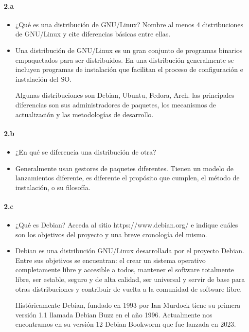 \documentclass[10pt,a4paper]{paper}
\begin{document}
	
	\paragraph{2.a}
	
	\begin{itemize}
		\item ¿Qué es una distribución de GNU/Linux? Nombre al menos 4 distribuciones
		de GNU/Linux y cite diferencias básicas entre ellas.
		
		\item Una distribución de GNU/Linux es un gran conjunto de programas binarios
		empaquetados para ser distribuidos. En una distribución generalmente se incluyen
		programas de instalación que facilitan el proceso de configuración e instalación
		del SO. 
		
		Algunas distribuciones son Debian, Ubuntu, Fedora, Arch. las principales
		diferencias son sus administradores de paquetes, los mecanismos de actualización
		y las metodologías de desarrollo. 
	\end{itemize}
	
	
	\paragraph{2.b}
	
	\begin{itemize}
		\item ¿En qué se diferencia una distribución de otra?
		
		\item Generalmente usan gestores de paquetes diferentes. Tienen un modelo de
		lanzamientos diferente, es diferente el propósito que cumplen, el método de
		instalación, o su filosofía. 
	\end{itemize}
	
	
	\paragraph{2.c}
	
	\begin{itemize}
		\item ¿Qué es Debian? Acceda al sitio https://www.debian.org/ e indique cuáles
		son los objetivos del proyecto y una breve cronología del mismo.
		
		\item Debian es una distribución GNU/Linux desarrollada por el proyecto Debian.
		Entre sus objetivos se encuentran: el crear un sistema operativo completamente
		libre y accesible a todos, mantener el software totalmente libre, ser estable,
		seguro y de alta calidad, ser universal y servir de base para otras
		distribuciones y contribuir de vuelta a la comunidad de software libre.
		
		Históricamente Debian, fundado en 1993 por Ian Murdock tiene su primera versión
		1.1 llamada Debian Buzz en el año 1996. Actualmente nos encontramos en su
		versión 12 Debian Bookworm que fue lanzada en 2023. 
	\end{itemize}
	
\end{document}
